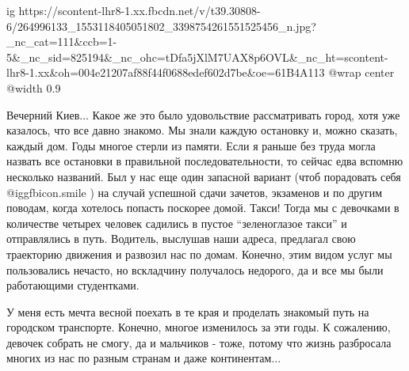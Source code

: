 \ifcmt
  ig https://scontent-lhr8-1.xx.fbcdn.net/v/t39.30808-6/264996133_1553118405051802_3398754261551525456_n.jpg?_nc_cat=111&ccb=1-5&_nc_sid=825194&_nc_ohc=tDfa5jXlM7UAX8p6OVL&_nc_ht=scontent-lhr8-1.xx&oh=004e21207af88f44f0688edef602d7be&oe=61B4A113
  @wrap center
  @width 0.9
\fi


Вечерний Киев... Какое же это было удовольствие рассматривать город, хотя уже
казалось, что все давно знакомо. Мы знали каждую остановку и, можно сказать,
каждый дом. Годы многое стерли из памяти. Если я раньше без труда могла назвать
все остановки в правильной последовательности, то сейчас едва вспомню несколько
названий. Был у нас еще один запасной вариант (чтоб порадовать себя @igg{fbicon.smile} ) на
случай успешной сдачи зачетов, экзаменов и по другим поводам, когда хотелось
попасть поскорее домой. Такси! Тогда мы с девочками в количестве четырех
человек садились в пустое \enquote{зеленоглазое такси} и отправлялись в путь. Водитель,
выслушав наши адреса, предлагал свою траекторию движения и развозил нас по
домам. Конечно, этим видом услуг мы пользовались нечасто, но вскладчину
получалось недорого, да и все мы были работающими студентками. 

У меня есть мечта весной поехать в те края и проделать знакомый путь на
городском транспорте. Конечно, многое изменилось за эти годы. К сожалению,
девочек собрать не смогу, да и мальчиков - тоже, потому что жизнь разбросала
многих из нас по разным странам и даже континентам...


